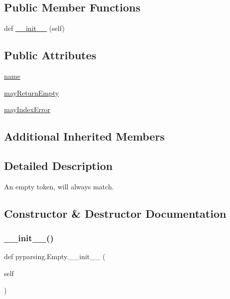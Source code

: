 \subsection*{Public Member Functions}
\begin{DoxyCompactItemize}
\item 
def \hyperlink{classpyparsing_1_1Empty_a4fe6aaca308c354d73ebdcbd17408006}{\+\_\+\+\_\+init\+\_\+\+\_\+} (self)
\end{DoxyCompactItemize}
\subsection*{Public Attributes}
\begin{DoxyCompactItemize}
\item 
\hyperlink{classpyparsing_1_1Empty_ae04a2cbc988edb36e7b6f3ee3e1e4388}{name}
\item 
\hyperlink{classpyparsing_1_1Empty_ae397329e36e15665f314dcac942a7223}{may\+Return\+Empty}
\item 
\hyperlink{classpyparsing_1_1Empty_a24977edc670e3cc62440b9c6120b7803}{may\+Index\+Error}
\end{DoxyCompactItemize}
\subsection*{Additional Inherited Members}


\subsection{Detailed Description}
\begin{DoxyVerb}An empty token, will always match.
\end{DoxyVerb}
 

\subsection{Constructor \& Destructor Documentation}
\mbox{\label{classpyparsing_1_1Empty_a4fe6aaca308c354d73ebdcbd17408006}} 
\subsubsection{\texorpdfstring{\+\_\+\+\_\+init\+\_\+\+\_\+()}{\_\_init\_\_()}}
{\footnotesize\ttfamily def pyparsing.\+Empty.\+\_\+\+\_\+init\+\_\+\+\_\+ (\begin{DoxyParamCaption}\item[{}]{self }\end{DoxyParamCaption})}



